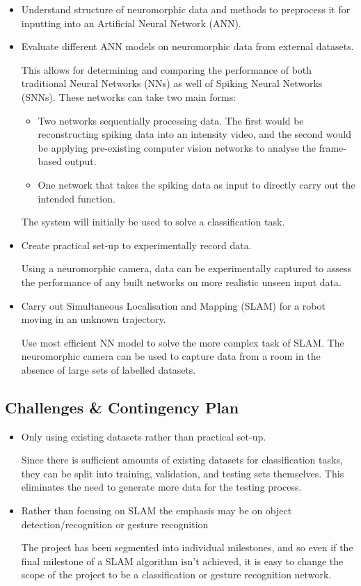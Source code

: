 \begin{itemize}
      \item Understand structure of neuromorphic data and methods to preprocess it for inputting into an Artificial Neural Network (ANN).
      \item Evaluate different ANN models on neuromorphic data from external datasets.

            This allows for determining and comparing the performance of both traditional Neural Networks (NNs) as well of Spiking Neural Networks (SNNs). These networks can take two main forms:
            \begin{itemize}
                  \item Two networks sequentially processing data. The first would be reconstructing spiking data into an intensity video, and the second would be applying pre-existing computer vision networks to analyse the frame-based output.
                  \item One network that takes the spiking data as input to directly carry out the intended function.
            \end{itemize}
            The system will initially be used to solve a classification task.
      \item Create practical set-up to experimentally record data.

            Using a neuromorphic camera, data can be experimentally captured to assess the performance of any built networks on more realistic unseen input data.
      \item Carry out Simultaneous Localisation and Mapping (SLAM) for a robot moving in an unknown trajectory.

            Use most efficient NN model to solve the more complex task of SLAM. The neuromorphic camera can be used to capture data from a room in the absence of large sets of labelled datasets.
\end{itemize}

\subsection{Challenges \& Contingency Plan}

\begin{itemize}
      \item Only using existing datasets rather than practical set-up.

            Since there is sufficient amounts of existing datasets for classification tasks, they can be split into training, validation, and testing sets themselves. This eliminates the need to generate more data for the testing process.
      \item Rather than focusing on SLAM the emphasis may be on object detection/recognition or gesture recognition

            The project has been segmented into individual milestones, and so even if the final milestone of a SLAM algorithm isn't achieved, it is easy to change the scope of the project to be a classification or gesture recognition network.
\end{itemize}

